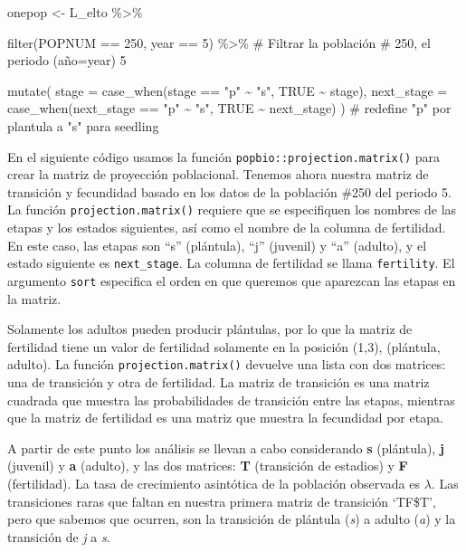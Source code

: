 \documentclass[
  12pt,
  letterpaper,
]{book}
\newenvironment{Shaded}{\begin{snugshade}}{\end{snugshade}}
\newcommand{\AttributeTok}[1]{\textcolor[rgb]{0.40,0.45,0.13}{#1}}
\newcommand{\CommentTok}[1]{\textcolor[rgb]{0.37,0.37,0.37}{#1}}
\newcommand{\ConstantTok}[1]{\textcolor[rgb]{0.56,0.35,0.01}{#1}}
\newcommand{\DecValTok}[1]{\textcolor[rgb]{0.68,0.00,0.00}{#1}}
\newcommand{\FunctionTok}[1]{\textcolor[rgb]{0.28,0.35,0.67}{#1}}
\newcommand{\NormalTok}[1]{\textcolor[rgb]{0.00,0.23,0.31}{#1}}
\newcommand{\OtherTok}[1]{\textcolor[rgb]{0.00,0.23,0.31}{#1}}
\newcommand{\SpecialCharTok}[1]{\textcolor[rgb]{0.37,0.37,0.37}{#1}}
\newcommand{\StringTok}[1]{\textcolor[rgb]{0.13,0.47,0.30}{#1}}
\begin{document}
\begin{Shaded}
\begin{Highlighting}[]
\NormalTok{onepop }\OtherTok{\textless{}{-}}\NormalTok{ L\_elto }\SpecialCharTok{\%\textgreater{}\%}

  \FunctionTok{filter}\NormalTok{(POPNUM }\SpecialCharTok{==} \DecValTok{250}\NormalTok{, year }\SpecialCharTok{==} \DecValTok{5}\NormalTok{) }\SpecialCharTok{\%\textgreater{}\%} \CommentTok{\# Filtrar la población \# 250, el periodo (año=year) 5}

  \FunctionTok{mutate}\NormalTok{(}
    \AttributeTok{stage =} \FunctionTok{case\_when}\NormalTok{(stage }\SpecialCharTok{==} \StringTok{"p"} \SpecialCharTok{\textasciitilde{}} \StringTok{"s"}\NormalTok{, }\ConstantTok{TRUE} \SpecialCharTok{\textasciitilde{}}\NormalTok{ stage),}
    \AttributeTok{next\_stage =} \FunctionTok{case\_when}\NormalTok{(next\_stage }\SpecialCharTok{==} \StringTok{"p"} \SpecialCharTok{\textasciitilde{}} \StringTok{"s"}\NormalTok{, }\ConstantTok{TRUE} \SpecialCharTok{\textasciitilde{}}\NormalTok{ next\_stage)}
\NormalTok{  ) }\CommentTok{\# redefine "p" por plantula a "s" para seedling}
\end{Highlighting}
\end{Shaded}

En el siguiente código usamos la función
\texttt{popbio::projection.matrix()} para crear la matriz de proyección
poblacional. Tenemos ahora nuestra matriz de transición y fecundidad
basado en los datos de la población \#250 del periodo 5. La función
\texttt{projection.matrix()} requiere que se especifiquen los nombres de
las etapas y los estados siguientes, así como el nombre de la columna de
fertilidad. En este caso, las etapas son ``s'' (plántula), ``j''
(juvenil) y ``a'' (adulto), y el estado siguiente es
\texttt{next\_stage}. La columna de fertilidad se llama
\texttt{fertility}. El argumento \texttt{sort} especifica el orden en
que queremos que aparezcan las etapas en la matriz.

Solamente los adultos pueden producir plántulas, por lo que la matriz de
fertilidad tiene un valor de fertilidad solamente en la posición (1,3),
(plántula, adulto). La función \texttt{projection.matrix()} devuelve una
lista con dos matrices: una de transición y otra de fertilidad. La
matriz de transición es una matriz cuadrada que muestra las
probabilidades de transición entre las etapas, mientras que la matriz de
fertilidad es una matriz que muestra la fecundidad por etapa.

A partir de este punto los análisis se llevan a cabo considerando
\textbf{s} (plántula), \textbf{j} (juvenil) y \textbf{a} (adulto), y las
dos matrices: \textbf{T} (transición de estadios) y \textbf{F}
(fertilidad). La tasa de crecimiento asintótica de la población
observada es \(\lambda\). Las transiciones raras que faltan en nuestra
primera matriz de transición `TF\$T', pero que sabemos que ocurren, son
la transición de plántula (\emph{s}) a adulto (\emph{a}) y la transición
de \emph{j} a \emph{s}.
\end{document}
